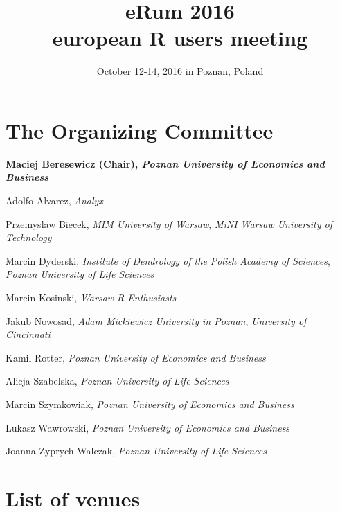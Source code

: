 \documentclass[11pt,twoside,b5paper]{book}
\title{eRum 2016 \\ european R users meeting}
\author{October 12-14, 2016 in Poznan, Poland}
\date{}
\begin{document}


\clearpage

\frontmatter
\maketitle

\chapter{The Organizing Committee}

\textbf{Maciej Beresewicz (Chair), \textit{Poznan University of Economics and Business}}

Adolfo Alvarez, \textit{Analyx}

Przemyslaw Biecek, \textit{MIM University of Warsaw}, \textit{MiNI Warsaw University of Technology}

Marcin Dyderski, \textit{Institute of Dendrology of the Polish Academy of Sciences}, \textit{Poznan University of Life Sciences}

Marcin Kosinski, \textit{Warsaw R Enthusiasts}

Jakub Nowosad, \textit{Adam Mickiewicz University in Poznan}, \textit{University of Cincinnati}

Kamil Rotter, \textit{Poznan University of Economics and Business}

Alicja Szabelska, \textit{Poznan University of Life Sciences}

Marcin Szymkowiak, \textit{Poznan University of Economics and Business}

Lukasz Wawrowski, \textit{Poznan University of Economics and Business}

Joanna Zyprych-Walczak, \textit{Poznan University of Life Sciences}

\chapter{List of venues}

\end{document}
